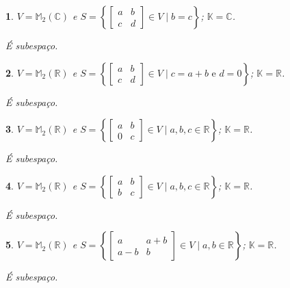 \documentclass[12pt]{exam}
\newtheorem{exercicio}{}
\newcommand{\real}{\mathbb{R}}
\newcommand{\complex}{\mathbb{C}}
\newcommand{\cp}[1]{\mathbb{#1}}
\begin{document}
\begin{exercicio}
$V = \cp{M}_2(\complex)$ e $S = \left\{\begin{bmatrix} a & b\\ c & d\end{bmatrix} \in V \mid b = c\right\}$; $\cp{K} = \complex$.
\begin{solucao}
  \'E subespa\c{c}o.
\end{solucao}
\end{exercicio}

\begin{exercicio}
$V = \cp{M}_2(\real)$ e $S = \left\{\begin{bmatrix} a & b\\ c & d\end{bmatrix} \in V \mid c = a + b \mbox{ e } d = 0\right\}$; $\cp{K} = \real$.
\begin{solucao}
  \'E subespa\c{c}o.
\end{solucao}
\end{exercicio}

\begin{exercicio}
$V = \cp{M}_2(\real)$ e $S = \left\{\begin{bmatrix} a & b\\ 0 & c\end{bmatrix} \in V \mid a, b, c \in \real\right\}$; $\cp{K} = \real$.
\begin{solucao}
  \'E subespa\c{c}o.
\end{solucao}
\end{exercicio}

\begin{exercicio}
$V = \cp{M}_2(\real)$ e $S = \left\{\begin{bmatrix} a & b\\ b & c\end{bmatrix} \in V \mid a, b, c \in \real\right\}$; $\cp{K} = \real$.
\begin{solucao}
  \'E subespa\c{c}o.
\end{solucao}
\end{exercicio}

\begin{exercicio}
$V = \cp{M}_2(\real)$ e $S = \left\{\begin{bmatrix} a & a+b\\ a-b & b\end{bmatrix} \in V \mid a, b \in \real \right\}$; $\cp{K} = \real$.
\begin{solucao}
  \'E subespa\c{c}o.
\end{solucao}
\end{exercicio}
\end{document}
